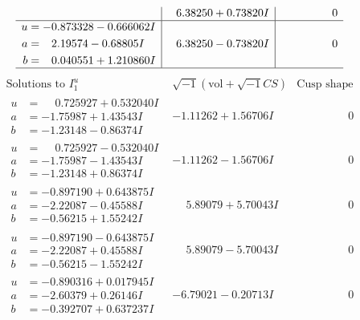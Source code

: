 \documentclass[1p]{elsarticle_modified}
\theoremstyle{definition}
\newcommand{\I}{\sqrt{-1}}
\begin{document}
$$\begin{array}{c|c|c}
 & \phantom{-}6.38250 + 0.73820 I & \phantom{-0.000000 } 0 \\ \hline\begin{aligned}
u &= -0.873328 - 0.666062 I \\
a &= \phantom{-}2.19574 - 0.68805 I \\
b &= \phantom{-}0.040551 + 1.210860 I\end{aligned}
 & \phantom{-}6.38250 - 0.73820 I & \phantom{-0.000000 } 0\\
 \hline 
 \end{array}$$\newpage$$\begin{array}{c|c|c}  
\text{Solutions to }I^u_{1}& \I (\text{vol} + \sqrt{-1}CS) & \text{Cusp shape}\\
 \hline 
\begin{aligned}
u &= \phantom{-}0.725927 + 0.532040 I \\
a &= -1.75987 + 1.43543 I \\
b &= -1.23148 - 0.86374 I\end{aligned}
 & -1.11262 + 1.56706 I & \phantom{-0.000000 } 0 \\ \hline\begin{aligned}
u &= \phantom{-}0.725927 - 0.532040 I \\
a &= -1.75987 - 1.43543 I \\
b &= -1.23148 + 0.86374 I\end{aligned}
 & -1.11262 - 1.56706 I & \phantom{-0.000000 } 0 \\ \hline\begin{aligned}
u &= -0.897190 + 0.643875 I \\
a &= -2.22087 - 0.45588 I \\
b &= -0.56215 + 1.55242 I\end{aligned}
 & \phantom{-}5.89079 + 5.70043 I & \phantom{-0.000000 } 0 \\ \hline\begin{aligned}
u &= -0.897190 - 0.643875 I \\
a &= -2.22087 + 0.45588 I \\
b &= -0.56215 - 1.55242 I\end{aligned}
 & \phantom{-}5.89079 - 5.70043 I & \phantom{-0.000000 } 0 \\ \hline\begin{aligned}
u &= -0.890316 + 0.017945 I \\
a &= -2.60379 + 0.26146 I \\
b &= -0.392707 + 0.637237 I\end{aligned}
 & -6.79021 - 0.20713 I & \phantom{-0.000000 } 0 \\ \hline\begin{aligned}

\end{aligned}
\end{array}$$
\end{document}
